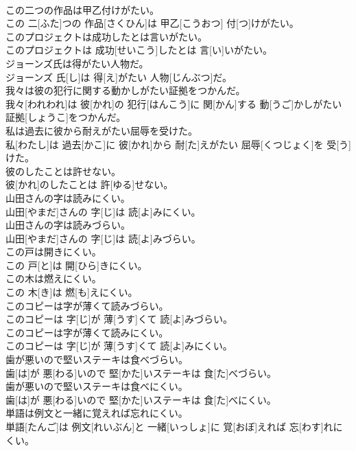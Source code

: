 \documentclass[8pt]{extreport}
\begin{document}
\begin{CJK}{UTF8}{min}
\\	この二つの作品は甲乙付けがたい。	
\\	この 二[ふた]つの 作品[さくひん]は 甲乙[こうおつ] 付[つ]けがたい。
\\	このプロジェクトは成功したとは言いがたい。	
\\	このプロジェクトは 成功[せいこう]したとは 言[い]いがたい。
\\	ジョーンズ氏は得がたい人物だ。	
\\	ジョーンズ 氏[し]は 得[え]がたい 人物[じんぶつ]だ。
\\	我々は彼の犯行に関する動かしがたい証拠をつかんだ。	
\\	我々[われわれ]は 彼[かれ]の 犯行[はんこう]に 関[かん]する 動[うご]かしがたい 証拠[しょうこ]をつかんだ。
\\	私は過去に彼から耐えがたい屈辱を受けた。	
\\	私[わたし]は 過去[かこ]に 彼[かれ]から 耐[た]えがたい 屈辱[くつじょく]を 受[う]けた。
\\	彼のしたことは許せない。	
\\	彼[かれ]のしたことは 許[ゆる]せない。
\\	山田さんの字は読みにくい。	
\\	山田[やまだ]さんの 字[じ]は 読[よ]みにくい。
\\	山田さんの字は読みづらい。	
\\	山田[やまだ]さんの 字[じ]は 読[よ]みづらい。
\\	この戸は開きにくい。	
\\	この 戸[と]は 開[ひら]きにくい。
\\	この木は燃えにくい。	
\\	この 木[き]は 燃[も]えにくい。
\\	このコピーは字が薄くて読みづらい。	
\\	このコピーは 字[じ]が 薄[うす]くて 読[よ]みづらい。
\\	このコピーは字が薄くて読みにくい。	
\\	このコピーは 字[じ]が 薄[うす]くて 読[よ]みにくい。
\\	歯が悪いので堅いステーキは食べづらい。	
\\	歯[は]が 悪[わる]いので 堅[かた]いステーキは 食[た]べづらい。
\\	歯が悪いので堅いステーキは食べにくい。	
\\	歯[は]が 悪[わる]いので 堅[かた]いステーキは 食[た]べにくい。
\\	単語は例文と一緒に覚えれば忘れにくい。	
\\	単語[たんご]は 例文[れいぶん]と 一緒[いっしょ]に 覚[おぼ]えれば 忘[わす]れにくい。

\end{CJK}
\end{document}
